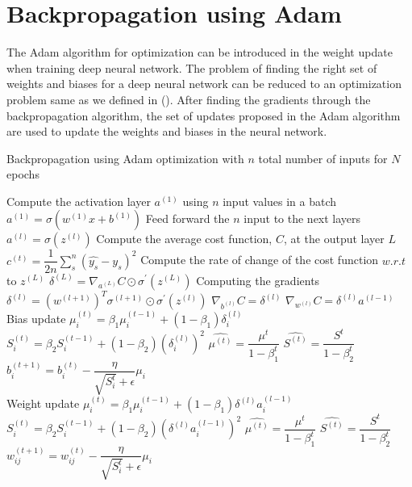 \section{Backpropagation using Adam}
The Adam algorithm for optimization can be introduced in the weight update when training deep neural network. The problem of finding the right set of weights and biases for a deep neural network can be reduced to an optimization problem same as we defined in (). After finding the gradients through the backpropagation algorithm, the set of updates proposed in the Adam algorithm are used to update the weights and biases in the neural network.
\begin{algorithm}[H]
  \caption{Backpropagation using Adam optimization with $n$ total number of inputs for $N$ epochs}\label{alg:back_propagation_adam_algo}
  \begin{algorithmic}[1]
  \State Compute the activation layer $a^{(1)}$ using $n$ input values in a batch
  \State $a^{(1)} = \sigma(w^{(1)}x + b^{(1)} )$
  \State Feed forward the $n$ input to the next layers
    \State $a^{(l)} = \sigma(z^{(l)})$
  \EndFor  
\EndFor
  \State Compute the average cost function, $C$, at the output layer $L$
  \State $c^{(t)} = \dfrac{1}{2n}\sum^{n}_s (\widehat{y_s}-y_s)^2$
  \State Compute the rate of change of the cost function $w.r.t$ to $z^{(L)}$
  \State $\delta^{(L)} = \nabla_{a^{(L)}}C \odot \sigma^{'}(z^{(L)})$
    \State Computing the gradients
    \State $\delta^{(l)} = (w^{(l+1)})^T\sigma^{(l+1)} \odot \sigma^{'}(z^{(l)})$
    \State $\nabla_{b^{(l)}} C = \delta^{(l)}$
    \State $\nabla_{w^{(l)}} C = \delta^{(l)}a^{(l-1)}$\\
    \State Bias update
    \State $\mu^{(t)}_i = \beta_1 {\mu}^{(t-1)}_i + (1-\beta_1)\delta^{(l)}_i$
    \State ${S}^{(t)}_i = \beta_2 {S}^{(t-1)}_i + (1-\beta_2)(\delta^{(l)}_i)^2$
    \State $\hat{\mu^{(t)}} = \dfrac{\mu^{t}}{1-\beta_1^t}$
    \State $ \hat{S^{(t)}} = \dfrac{S^t}{1-\beta_2^t}$
    \State ${b}^{(t+1)}_i = {b}^{(t)}_i - \dfrac{\eta}{\sqrt{S^t_i} + \epsilon}\mu_i$\\
    \State Weight update
    \State $\mu^{(t)}_i = \beta_1 {\mu}^{(t-1)}_i + (1-\beta_1)\delta^{(l)}a^{(l-1)}_i$
    \State ${S}^{(t)}_i = \beta_2 {S}^{(t-1)}_i + (1-\beta_2)(\delta^{(l)}a^{(l-1)}_i)^2$
    \State $\hat{\mu^{(t)}} = \dfrac{\mu^{t}}{1-\beta_1^t}$
    \State $\hat{S^{(t)}} = \dfrac{S^t}{1-\beta_2^t}$
    \State ${w}^{(t+1)}_{ij} = {w}^{(t)}_{ij} - \dfrac{\eta}{\sqrt{S^t_i} + \epsilon}\mu_i$
  \EndFor
\EndFor
\end{algorithmic}
\end{algorithm}